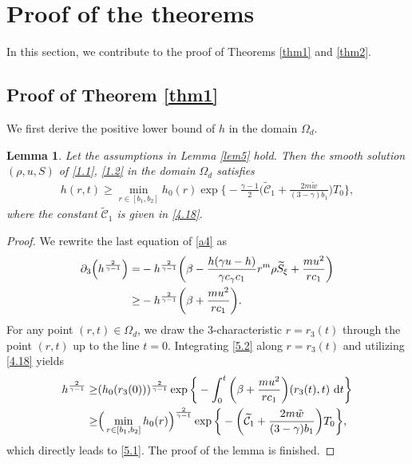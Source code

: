 \documentclass[11pt,reqno]{article}
\newtheorem{lem}{Lemma}[section]
\newcommand{\fr}{\frac}
\newcommand{\pa}{\partial}
\numberwithin{equation}{section}
\begin{document}
\section{Proof of the theorems}\label{S5}

In this section, we contribute to the proof of Theorems \ref{thm1} and \ref{thm2}.



\subsection{Proof of Theorem \ref{thm1}}\label{S51}


We first derive the positive lower bound of $h$ in the domain $\Omega_d$.
\begin{lem}\label{lem8}
Let the assumptions in Lemma \ref{lem5} hold.
Then the smooth solution $(\rho, u, S)$ of \eqref{1.1}, \eqref{1.2} in the domain $\Omega_d$ satisfies
\begin{align}\label{5.1}
h(r,t)\geq \min_{r\in[b_1,b_2]}h_0(r)\exp\bigg\{-\fr{\gamma-1}{2} \bigg(\widetilde{\mathcal{C}}_1+\fr{2m\tilde{w}}{(3-\gamma)b_1}\bigg)T_0\bigg\},
\end{align}
where the constant $\widetilde{\mathcal{C}}_1$ is given in \eqref{4.18}.
\end{lem}
\begin{proof}
We rewrite the last equation of \eqref{a4} as
\begin{align}\label{5.2}
\pa_3\Big(h^{\fr{2}{\gamma-1}}\Big)=& -h^{\fr{2}{\gamma-1}}\bigg(\beta
    -\frac{h(\gamma u-h)}{\gamma c_\gamma c_1}r^m\rho \widetilde{S}_\xi
    +\frac{mu^2}{rc_1}\bigg) \notag \\
\geq & -h^{\fr{2}{\gamma-1}}\bigg(\beta +\frac{mu^2}{rc_1}\bigg).
\end{align}
For any point $(r,t)\in\Omega_d$, we draw the $3$-characteristic $r=r_3(t)$ through the point $(r,t)$ up to the line $t=0$. Integrating \eqref{5.2} along $r=r_3(t)$ and utilizing \eqref{4.18} yields
\begin{align}\label{5.3}
h^{\fr{2}{\gamma-1}}\geq & (h_0(r_3(0)))^{\fr{2}{\gamma-1}}\exp\bigg\{ -\int_{0}^t\bigg(\beta +\frac{mu^2}{rc_1}\bigg)(r_3(t),t)\ {\rm d}t\bigg\} \notag \\
\geq & \Big(\min_{r\in[b_1,b_2]}h_0(r)\Big)^{\fr{2}{\gamma-1}}\exp\bigg\{ -\bigg(\widetilde{\mathcal{C}}_1+\fr{2m\tilde{w}}{(3-\gamma)b_1}\bigg)T_0\bigg\},
\end{align}
which directly leads to \eqref{5.1}. The proof of the lemma is finished.
\end{proof}
\end{document}
